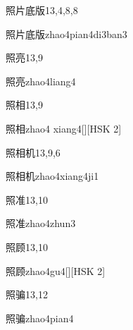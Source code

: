 \begin{entry}{照片底版}{13,4,8,8}
  \begin{phonetics}{照片底版}{zhao4pian4di3ban3}
  \end{phonetics}
\end{entry}

\begin{entry}{照亮}{13,9}
  \begin{phonetics}{照亮}{zhao4liang4}
  \end{phonetics}
\end{entry}

\begin{entry}{照相}{13,9}
  \begin{phonetics}{照相}{zhao4 xiang4}[][HSK 2]
  \end{phonetics}
\end{entry}

\begin{entry}{照相机}{13,9,6}
  \begin{phonetics}{照相机}{zhao4xiang4ji1}
  \end{phonetics}
\end{entry}

\begin{entry}{照准}{13,10}
  \begin{phonetics}{照准}{zhao4zhun3}
  \end{phonetics}
\end{entry}

\begin{entry}{照顾}{13,10}
  \begin{phonetics}{照顾}{zhao4gu4}[][HSK 2]
  \end{phonetics}
\end{entry}

\begin{entry}{照骗}{13,12}
  \begin{phonetics}{照骗}{zhao4pian4}
  \end{phonetics}
\end{entry}

